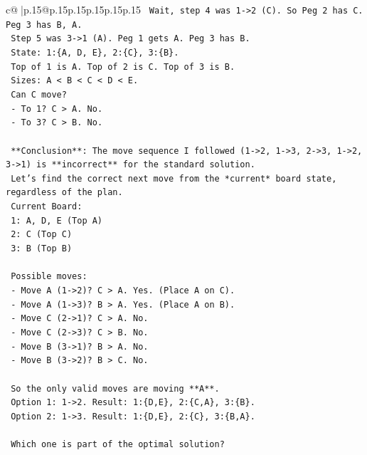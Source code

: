 \documentclass{article}
\begin{document}
{\begin{supertabular}{c@{$\;$}|p{.15\linewidth}@{}p{.15\linewidth}p{.15\linewidth}p{.15\linewidth}p{.15\linewidth}p{.15\linewidth}}
{{{\texttt{        Wait, step 4 was 1{-}>2 (C). So Peg 2 has C. Peg 3 has B, A.} \\
\texttt{        Step 5 was 3{-}>1 (A). Peg 1 gets A. Peg 3 has B.} \\
\texttt{        State: 1:\{A, D, E\}, 2:\{C\}, 3:\{B\}.} \\
\texttt{        Top of 1 is A. Top of 2 is C. Top of 3 is B.} \\
\texttt{        Sizes: A < B < C < D < E.} \\
\texttt{        Can C move?} \\
\texttt{        {-} To 1? C > A. No.} \\
\texttt{        {-} To 3? C > B. No.} \\
\\ 
\texttt{        **Conclusion**: The move sequence I followed (1{-}>2, 1{-}>3, 2{-}>3, 1{-}>2, 3{-}>1) is **incorrect** for the standard solution.} \\
\texttt{        Let's find the correct next move from the *current* board state, regardless of the plan.} \\
\texttt{        Current Board:} \\
\texttt{        1: A, D, E (Top A)} \\
\texttt{        2: C (Top C)} \\
\texttt{        3: B (Top B)} \\
\\ 
\texttt{        Possible moves:} \\
\texttt{        {-} Move A (1{-}>2)? C > A. Yes. (Place A on C).} \\
\texttt{        {-} Move A (1{-}>3)? B > A. Yes. (Place A on B).} \\
\texttt{        {-} Move C (2{-}>1)? C > A. No.} \\
\texttt{        {-} Move C (2{-}>3)? C > B. No.} \\
\texttt{        {-} Move B (3{-}>1)? B > A. No.} \\
\texttt{        {-} Move B (3{-}>2)? B > C. No.} \\
\\ 
\texttt{        So the only valid moves are moving **A**.} \\
\texttt{        Option 1: 1{-}>2. Result: 1:\{D,E\}, 2:\{C,A\}, 3:\{B\}.} \\
\texttt{        Option 2: 1{-}>3. Result: 1:\{D,E\}, 2:\{C\}, 3:\{B,A\}.} \\
\\ 
\texttt{        Which one is part of the optimal solution?} \\
}}}
\end{supertabular}}
\end{document}
